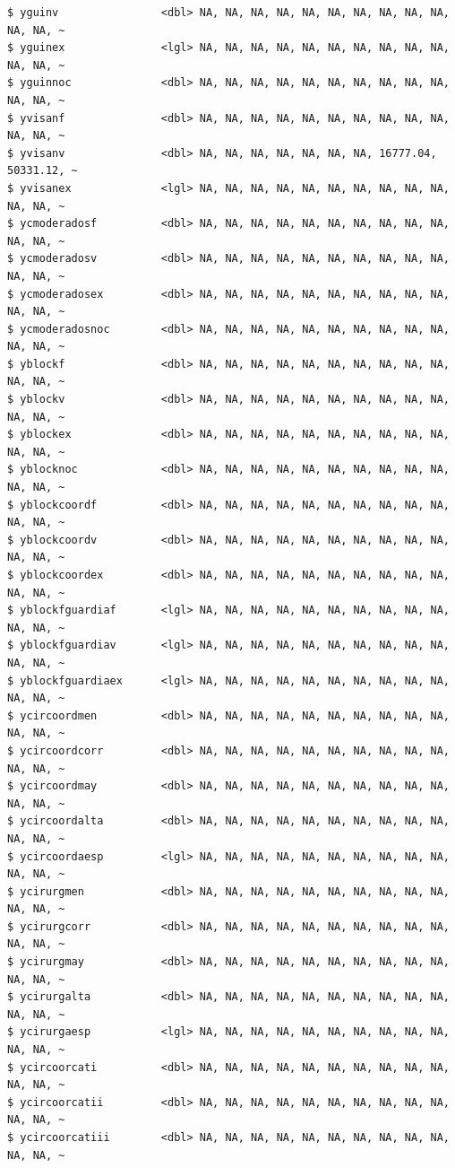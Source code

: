 \documentclass[
  letterpaper,
  DIV=11,
  numbers=noendperiod]{scrreprt}
\begin{document}
\begin{verbatim}
$ yguinv                <dbl> NA, NA, NA, NA, NA, NA, NA, NA, NA, NA, NA, NA, ~
$ yguinex               <lgl> NA, NA, NA, NA, NA, NA, NA, NA, NA, NA, NA, NA, ~
$ yguinnoc              <dbl> NA, NA, NA, NA, NA, NA, NA, NA, NA, NA, NA, NA, ~
$ yvisanf               <dbl> NA, NA, NA, NA, NA, NA, NA, NA, NA, NA, NA, NA, ~
$ yvisanv               <dbl> NA, NA, NA, NA, NA, NA, NA, 16777.04, 50331.12, ~
$ yvisanex              <lgl> NA, NA, NA, NA, NA, NA, NA, NA, NA, NA, NA, NA, ~
$ ycmoderadosf          <dbl> NA, NA, NA, NA, NA, NA, NA, NA, NA, NA, NA, NA, ~
$ ycmoderadosv          <dbl> NA, NA, NA, NA, NA, NA, NA, NA, NA, NA, NA, NA, ~
$ ycmoderadosex         <dbl> NA, NA, NA, NA, NA, NA, NA, NA, NA, NA, NA, NA, ~
$ ycmoderadosnoc        <dbl> NA, NA, NA, NA, NA, NA, NA, NA, NA, NA, NA, NA, ~
$ yblockf               <dbl> NA, NA, NA, NA, NA, NA, NA, NA, NA, NA, NA, NA, ~
$ yblockv               <dbl> NA, NA, NA, NA, NA, NA, NA, NA, NA, NA, NA, NA, ~
$ yblockex              <dbl> NA, NA, NA, NA, NA, NA, NA, NA, NA, NA, NA, NA, ~
$ yblocknoc             <dbl> NA, NA, NA, NA, NA, NA, NA, NA, NA, NA, NA, NA, ~
$ yblockcoordf          <dbl> NA, NA, NA, NA, NA, NA, NA, NA, NA, NA, NA, NA, ~
$ yblockcoordv          <dbl> NA, NA, NA, NA, NA, NA, NA, NA, NA, NA, NA, NA, ~
$ yblockcoordex         <dbl> NA, NA, NA, NA, NA, NA, NA, NA, NA, NA, NA, NA, ~
$ yblockfguardiaf       <lgl> NA, NA, NA, NA, NA, NA, NA, NA, NA, NA, NA, NA, ~
$ yblockfguardiav       <lgl> NA, NA, NA, NA, NA, NA, NA, NA, NA, NA, NA, NA, ~
$ yblockfguardiaex      <lgl> NA, NA, NA, NA, NA, NA, NA, NA, NA, NA, NA, NA, ~
$ ycircoordmen          <dbl> NA, NA, NA, NA, NA, NA, NA, NA, NA, NA, NA, NA, ~
$ ycircoordcorr         <dbl> NA, NA, NA, NA, NA, NA, NA, NA, NA, NA, NA, NA, ~
$ ycircoordmay          <dbl> NA, NA, NA, NA, NA, NA, NA, NA, NA, NA, NA, NA, ~
$ ycircoordalta         <dbl> NA, NA, NA, NA, NA, NA, NA, NA, NA, NA, NA, NA, ~
$ ycircoordaesp         <lgl> NA, NA, NA, NA, NA, NA, NA, NA, NA, NA, NA, NA, ~
$ ycirurgmen            <dbl> NA, NA, NA, NA, NA, NA, NA, NA, NA, NA, NA, NA, ~
$ ycirurgcorr           <dbl> NA, NA, NA, NA, NA, NA, NA, NA, NA, NA, NA, NA, ~
$ ycirurgmay            <dbl> NA, NA, NA, NA, NA, NA, NA, NA, NA, NA, NA, NA, ~
$ ycirurgalta           <dbl> NA, NA, NA, NA, NA, NA, NA, NA, NA, NA, NA, NA, ~
$ ycirurgaesp           <lgl> NA, NA, NA, NA, NA, NA, NA, NA, NA, NA, NA, NA, ~
$ ycircoorcati          <dbl> NA, NA, NA, NA, NA, NA, NA, NA, NA, NA, NA, NA, ~
$ ycircoorcatii         <dbl> NA, NA, NA, NA, NA, NA, NA, NA, NA, NA, NA, NA, ~
$ ycircoorcatiii        <dbl> NA, NA, NA, NA, NA, NA, NA, NA, NA, NA, NA, NA, ~

\end{verbatim}
\end{document}
